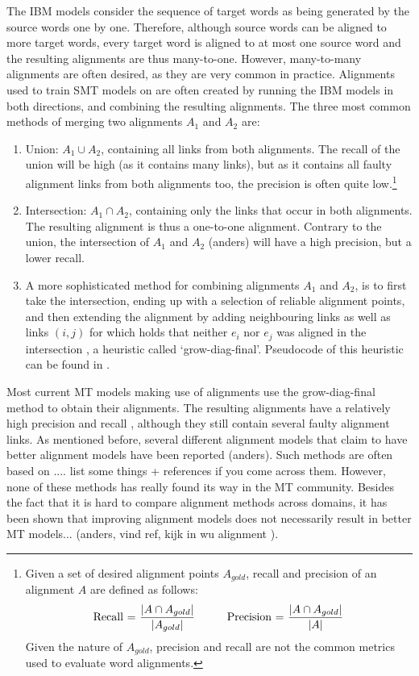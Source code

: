 \documentclass{report}
\theoremstyle{definition}
\theoremstyle{plain}
\begin{document}
The IBM models consider the sequence of target words as being generated by the source words one by one. Therefore, although source words can be aligned to more target words, every target word is aligned to at most one source word and the resulting alignments are thus many-to-one. However, many-to-many alignments are often desired, as they are very common in practice. Alignments used to train SMT models on are often created by running the IBM models in both directions, and combining the resulting alignments. The three most common methods of merging two alignments $A_1$ and $A_2$ are:\begin{enumerate}
\item Union: $A_1\cup A_2$, containing all links from both alignments. The recall of the union will be high (as it contains many links), but as it contains all faulty alignment links from both alignments too, the precision is often quite low.\footnote{Given a set of desired alignment points $A_{gold}$, recall and precision of an alignment $A$ are defined as follows:\\
$$\text{Recall = }\frac{|A \cap A_{gold}|}{|A_{gold}|} \text{\hspace{10mm}Precision = }\frac{|A \cap A_{gold}|}{|A|}$$
Given the nature of $A_{gold}$, precision and recall are not the common metrics used to evaluate word alignments.}
\item Intersection: $A_1\cap A_2$, containing only the links that occur in both alignments. The resulting alignment is thus a one-to-one alignment. Contrary to the union, the intersection of $A_1$ and $A_2$ (anders) will have a high precision, but a lower recall.
\item A more sophisticated method for combining alignments $A_1$ and $A_2$, is to first take the intersection, ending up with a selection of reliable alignment points, and then extending the alignment by adding neighbouring links as well as links $(i,j)$ for which holds that neither $e_i$ nor $e_j$ was aligned in the intersection \citep{och2000improved}, a heuristic called `grow-diag-final'. Pseudocode of this heuristic can be found in \cite{koehn2008statistical}.
\end{enumerate}

Most current MT models making use of alignments use the grow-diag-final method to obtain their alignments. The resulting alignments have a relatively high precision and recall \citep{och2000improved}, although they still contain several faulty alignment links. As mentioned before, several different alignment models that claim to have better alignment models have been reported (anders). Such methods are often based on .... list some things + references if you come across them. However, none of these methods has really found its way in the MT community. Besides the fact that it is hard to compare alignment methods across domains, it has been shown that improving alignment models does not necessarily result in better MT models... (anders, vind ref, kijk in wu alignment \cite{indurkhya2010handbook}).
\end{document}
